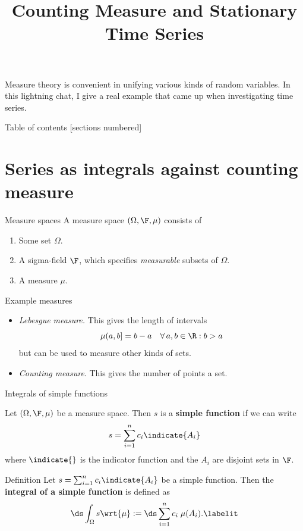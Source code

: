 \documentclass[10pt]{beamer}
\title{Counting Measure and Stationary Time Series}
\begin{document}
\maketitle

\begin{frame}[standout]
 Measure theory is convenient in unifying various kinds of random variables.	
 \vfill
 \small{In this lightning chat, I give a real example that came up when investigating time series.}
\end{frame}


\begin{frame}{Table of contents}
  [sections numbered]
  \tableofcontents[hideallsubsections]
\end{frame}

\section{Series as integrals against counting measure}

\begin{frame}{Measure spaces}
A measure space $(\Omega, \F, \mu)$ consists of

\begin{enumerate}
\item Some set $\Omega$.
\item A sigma-field $\F$, which specifies \textit{measurable} subsets of $\Omega$.
\item A measure $\mu$.	
\end{enumerate}

\vfill 
 
Example measures
 \begin{itemize}
 \item 
 \textit{Lebesgue measure.} This gives the length of intervals  
\[ \mu(a,b] = b-a \quad \forall \, a,b \in \R : b>a \]
but can be used to measure other kinds of sets.
\item \textit{Counting measure}. This gives the number of points a set.
 \end{itemize}

\end{frame}

\begin{frame}{Integrals of simple functions}

\vfill 
\begin{definition}
Let $(\Omega, \F, \mu)$ be a measure space. Then $s$ is a \textbf{simple function} if we can write 
\[s = \sum_{i=1}^n c_i \indicate{A_i} \] 
where $\indicate{}$ is the indicator function and the $A_i$ are disjoint sets in $\F$. 
\end{definition}

\vfill 
\begin{block}{Definition}
Let $s = \sum_{i=1}^n c_i \indicate{A_i}$ be a simple function. Then the \textbf{integral of a simple function} is defined as
%
\begin{align*}
\ds\int_\Omega s \wrt{\mu} := \ds\sum_{i=1}^n c_i \; \mu(A_i).
\labelit \label{eqn:integral_of_simple_function}	
\end{align*}
\end{block}	
\end{frame}
\end{document}

